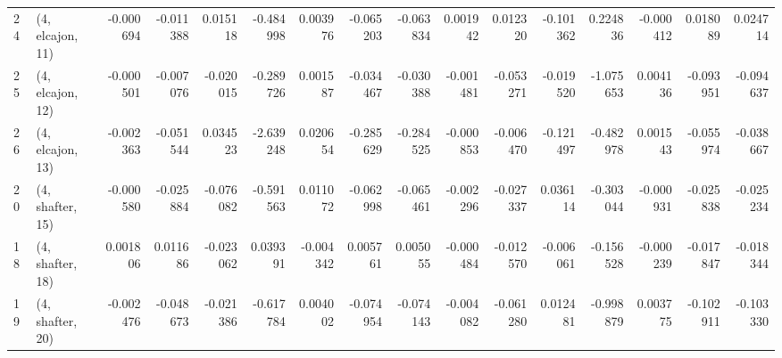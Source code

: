 \begin{tabular}{llrrrrrrrrrrrrrr}
24 &  (4, elcajon, 11) &  -0.000694 & -0.011388 &  0.015118 &  -0.484998 &  0.003976 &  -0.065203 & -0.063834 &  0.001942 &  0.012320 & -0.101362 &   0.224836 & -0.000412 &  0.018089 &  0.024714 \\
25 &  (4, elcajon, 12) &  -0.000501 & -0.007076 & -0.020015 &  -0.289726 &  0.001587 &  -0.034467 & -0.030388 & -0.001481 & -0.053271 & -0.019520 &  -1.075653 &  0.004136 & -0.093951 & -0.094637 \\
26 &  (4, elcajon, 13) &  -0.002363 & -0.051544 &  0.034523 &  -2.639248 &  0.020654 &  -0.285629 & -0.284525 & -0.000853 & -0.006470 & -0.121497 &  -0.482978 &  0.001543 & -0.055974 & -0.038667 \\
20 &  (4, shafter, 15) &  -0.000580 & -0.025884 & -0.076082 &  -0.591563 &  0.011072 &  -0.062998 & -0.065461 & -0.002296 & -0.027337 &  0.036114 &  -0.303044 & -0.000931 & -0.025838 & -0.025234 \\
18 &  (4, shafter, 18) &   0.001806 &  0.011686 & -0.023062 &   0.039391 & -0.004342 &   0.005761 &  0.005055 & -0.000484 & -0.012570 & -0.006061 &  -0.156528 & -0.000239 & -0.017847 & -0.018344 \\
19 &  (4, shafter, 20) &  -0.002476 & -0.048673 & -0.021386 &  -0.617784 &  0.004002 &  -0.074954 & -0.074143 & -0.004082 & -0.061280 &  0.012481 &  -0.998879 &  0.003775 & -0.102911 & -0.103330 \\
\bottomrule
\end{tabular}
